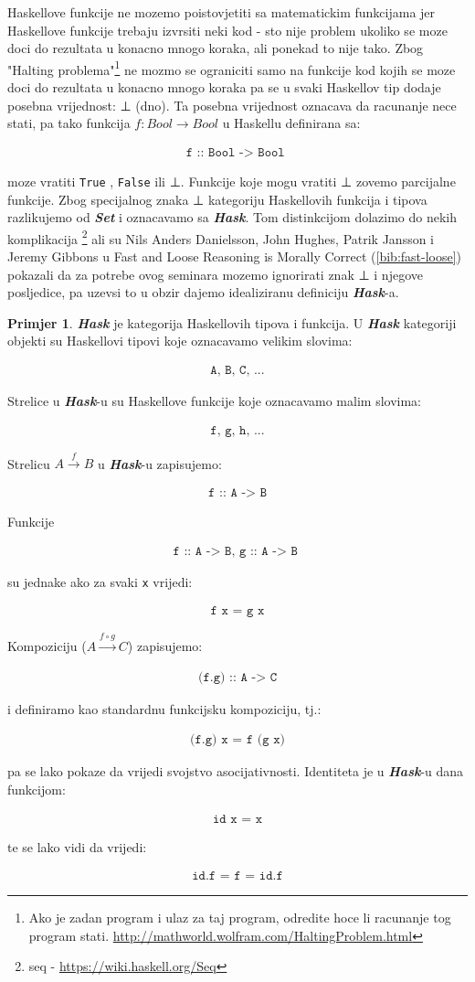 \documentclass[11pt]{article}
\newcommand{\category}[1]{\textbf{\emph{#1}}}
\newcommand{\codei}[1]{
  {\lstinline[basicstyle=\ttfamily]{#1}}
}
\newcommand{\code}[1]{
  \begin{align*}
    \texttt{#1}
  \end{align*}
  }
\theoremstyle{definition}
\newtheorem{primjer}{Primjer}
\begin{document}
  Haskellove funkcije ne mozemo poistovjetiti sa matematickim funkcijama jer
  Haskellove funkcije trebaju izvrsiti neki kod - sto nije problem ukoliko se
  moze doci do rezultata u konacno mnogo koraka, ali ponekad to nije tako. Zbog "Halting
  problema"\footnote{Ako je zadan program i ulaz za taj program, odredite hoce
    li racunanje tog program stati.
    \url{http://mathworld.wolfram.com/HaltingProblem.html}} ne mozmo se
  ograniciti samo na funkcije kod kojih se moze doci do rezultata u konacno
  mnogo koraka pa se u svaki Haskellov tip dodaje posebna vrijednost: ⊥ (dno).
  Ta posebna vrijednost oznacava da racunanje nece stati, pa tako funkcija $f:
  Bool \to Bool$  u Haskellu definirana sa:
  \code{
    f :: Bool -> Bool
  }
  moze vratiti \codei{True}, \codei{False} ili ⊥. Funkcije koje mogu vratiti ⊥
  zovemo parcijalne funkcije.
  Zbog specijalnog znaka ⊥ kategoriju Haskellovih funkcija i tipova razlikujemo
  od \category{Set} i oznacavamo sa \category{Hask}. Tom distinkcijom dolazimo
  do nekih komplikacija \footnote{seq - \url{https://wiki.haskell.org/Seq}}
  ali su Nils Anders Danielsson, John Hughes, Patrik Jansson i Jeremy Gibbons
  u Fast and Loose Reasoning is Morally Correct (\ref{bib:fast-loose}) pokazali
  da za potrebe ovog seminara mozemo ignorirati znak ⊥ i njegove posljedice, pa
  uzevsi to u obzir dajemo idealiziranu definiciju \category{Hask}-a.
  \begin{primjer} \category{Hask} je kategorija Haskellovih tipova i funkcija. U
  \category{Hask} kategoriji objekti su Haskellovi tipovi koje oznacavamo velikim
  slovima:
    \code{A, B, C, ...}
  Strelice u \category{Hask}-u su Haskellove funkcije koje oznacavamo malim
  slovima:
    \code{f, g, h, ...}
  Strelicu $A \xrightarrow{f} B$ u \category{Hask}-u zapisujemo:
    \code{f :: A -> B}
  Funkcije
    \code{
      f :: A -> B, g :: A -> B
      }
  su jednake ako za svaki \texttt{x} vrijedi:
    \code{ f x = g x }
  Kompoziciju ($A \xrightarrow{f \circ g} C$) zapisujemo:
    \code{(f.g) :: A -> C}
    i definiramo kao standardnu funkcijsku kompoziciju, tj.:
    \code{(f.g) x = f (g x)}
  pa se lako pokaze da vrijedi svojstvo asocijativnosti.
  Identiteta je u \category{Hask}-u dana funkcijom:
    \code{ id x = x }
  te se lako vidi da vrijedi:
    \code{ id.f = f = id.f }
  \end{primjer}
\end{document}
